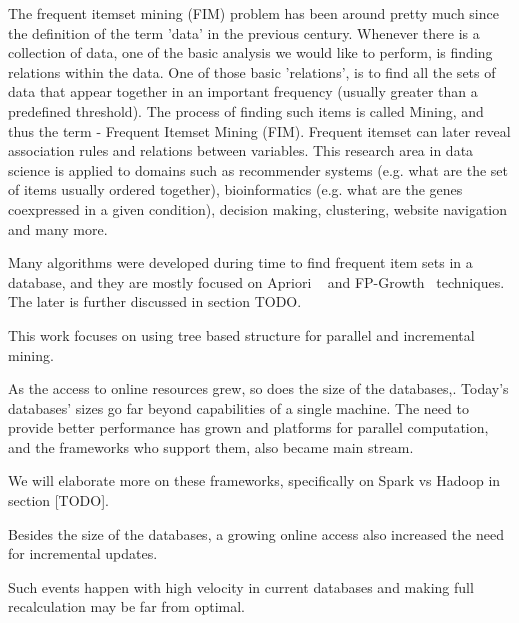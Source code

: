 The frequent itemset mining (FIM) problem has been around pretty much since the definition of the term 'data' in the previous century. Whenever there is a collection of data, one of the basic analysis we would like to perform, is finding relations within the data. One of those basic 'relations', is to find all the sets of data that appear together in an important frequency (usually greater than a predefined threshold).  The process of finding such items is called Mining, and thus the term - Frequent Itemset Mining (FIM). Frequent itemset can later reveal association rules and relations between variables. This research area in data science is applied to domains such as recommender systems (e.g. what are the set of items usually ordered together), bioinformatics (e.g. what are the genes coexpressed in a given condition), decision making, clustering, website navigation and many more.

Many algorithms were developed during time to find frequent item sets in a database, and they are mostly focused on Apriori ~\cite{agrawal1994fast} and FP-Growth~\cite{kohefficient} techniques.  The later is further discussed in section TODO.

This work focuses on using tree based structure for parallel and incremental mining. 

As the access to online resources grew, so does the size of the databases,. Today’s databases’ sizes go far beyond capabilities of a single machine. The need to provide better performance has grown and platforms for parallel computation, and the frameworks who support them, also became main stream.

 
We will elaborate more on these frameworks, specifically on Spark vs Hadoop in section [TODO].


Besides the size of the databases, a growing online access also increased the need for incremental updates. 
\iffalse
In case of a slight database update, like add-on of new transactions to the DB, some algorithms require a rerun of the whole database.
With the need of better performance To provide better performance, parallel execution frameworks, such as Hadoop and Spark, become more accessible and common,  and as such, so does the adoption of classical algorithms to parallel execution.  
\fi
Such events happen with high velocity in current databases and making full recalculation may be far from optimal. 

